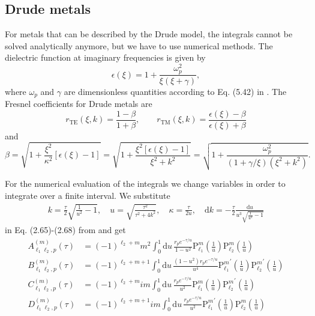 \documentclass[10pt]{article}
\newcommand{\imag}{i} %
\newcommand{\e}{e}    %
\newcommand{\TE}{\mathrm{TE}}
\newcommand{\TM}{\mathrm{TM}}
\newcommand{\Plm}[2]{{\text{P}_{#1}^{#2}}}
\begin{document}
\subsection{Drude metals}

For metals that can be described by the Drude model, the integrals cannot be
solved analytically anymore, but we have to use numerical methods. The dielectric
function at imaginary frequencies is given by
\begin{equation}
\epsilon(\xi) = 1+ \frac{\omega_p^2}{\xi(\xi+\gamma)},
\end{equation}
where $\omega_p$ and $\gamma$ are dimensionless quantities according to Eq. (5.42) in \cite{hartmann}.
The Fresnel coefficients for Drude metals are
\begin{equation}
r_\TE(\xi,k) = \frac{1-\beta}{1+\beta}, \quad\quad r_\TM(\xi,k) = \frac{\epsilon(\xi)-\beta}{\epsilon(\xi)+\beta}
\end{equation}
and
\begin{equation}
\beta = \sqrt{1+ \frac{\xi^2}{\kappa^2}\left[\epsilon(\xi)-1\right]} = \sqrt{1+ \frac{\xi^2 \left[\epsilon(\xi)-1\right]}{\xi^2+k^2}} = \sqrt{1+ \frac{\omega_p^2}{(1+\gamma/\xi)(\xi^2+k^2)}}.
\end{equation}

For the numerical evaluation of the integrals we change variables in order to
integrate over a finite interval.
We substitute
\begin{align}
k = \frac{\tau}{2}\sqrt{\frac{1}{u^2}-1}, \quad u = \sqrt{\frac{\tau^2}{\tau^2+4k^2}}, \quad \kappa = \frac{\tau}{2u}, \quad \mathrm{d}k = -\frac{\tau}{2} \frac{\mathrm{d}u}{u^3 \sqrt{\frac{1}{u^2}-1}}
\end{align}
in Eq. (2.65)-(2.68) from \cite{hartmann} and get
\begin{align}
A_{\ell_1\ell_2,p}^{(m)}(\tau) &= (-1)^{\ell_2+m} m^2 \int_0^1 \mathrm{d}u \, \frac{r_p \e^{-\tau/u}}{1-u^2} \Plm{\ell_1}{m}\left(\frac{1}{u}\right) \Plm{\ell_2}{m}\left(\frac{1}{u}\right) \\
B_{\ell_1\ell_2,p}^{(m)}(\tau) &= (-1)^{\ell_2+m+1}   \int_0^1 \mathrm{d}u \, \frac{(1-u^2) r_p \e^{-\tau/u} }{u^4} \Plm{\ell_1}{m}^\prime\left(\frac{1}{u}\right) \Plm{\ell_2}{m}^\prime\left(\frac{1}{u}\right) \\
C_{\ell_1\ell_2,p}^{(m)}(\tau) &= (-1)^{\ell_2+m} \imag m \int_0^1 \mathrm{d}u \, \frac{r_p \e^{-\tau/u}}{u^2} \Plm{\ell_1}{m}\left(\frac{1}{u}\right) \Plm{\ell_2}{m}^\prime\left(\frac{1}{u}\right) \\
D_{\ell_1\ell_2,p}^{(m)}(\tau) &= (-1)^{\ell_2+m+1} \imag m \int_0^1 \mathrm{d}u \, \frac{r_p \e^{-\tau/u}}{u^2} \Plm{\ell_1}{m}^\prime\left(\frac{1}{u}\right) \Plm{\ell_2}{m}\left(\frac{1}{u}\right)
\end{align}
\end{document}
